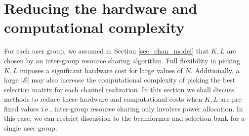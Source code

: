 \documentclass[journal,comsoc]{IEEEtran}
\begin{document}
\section{Reducing the hardware and computational complexity} \label{sec_hardware_cost}
For each user group, we assumed in Section \ref{sec_chan_model} that $K,L$ are chosen by an inter-group resource sharing algorithm. Full flexibility in picking $K,L$ imposes a significant hardware cost for large values of $N$. Additionally, a large $|\mathcal{S}|$ may also increase the computational complexity of picking the best selection matrix for each channel realization. In this section we shall discuss methods to reduce these hardware and computational costs when $K,L$ are pre-fixed values i.e., inter-group resource sharing only involves power allocation. In this case, we can restrict discussion to the beamformer and selection bank for a single user group. 
\end{document}
